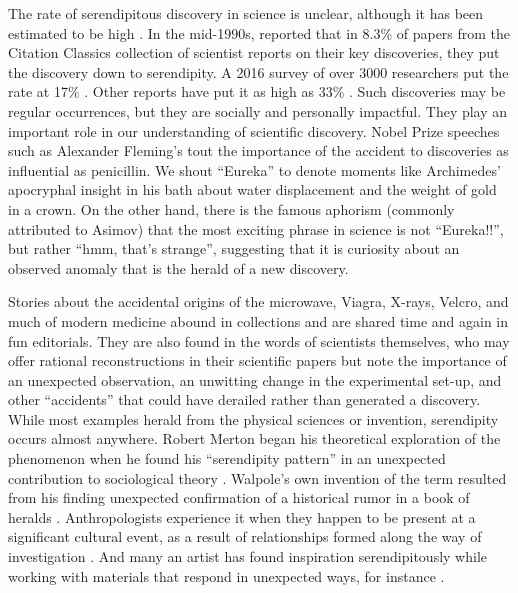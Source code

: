 \documentclass[authordate, empirical]{jote-new-article}
\begin{document}
The rate of serendipitous discovery in science is unclear, although it has been estimated to be high \parencites{Thagard2012}. In the mid-1990s, \textcites{Campanario1996} reported that in 8.3\% of papers from the Citation Classics collection of scientist reports on their key discoveries, they put the discovery down to serendipity. A 2016 survey of over 3000 researchers put the rate at 17\% \parencites{Willems2022}. Other reports have put it as high as 33\% \parencites{Hargrave-Thomas2012}. Such discoveries may be regular occurrences, but they are socially and personally impactful. They play an important role in our understanding of scientific discovery. Nobel Prize speeches such as Alexander Fleming's tout the importance of the accident to discoveries as influential as penicillin. We shout “Eureka” to denote moments like Archimedes' apocryphal insight in his bath about water displacement and the weight of gold in a crown. On the other hand, there is the famous aphorism (commonly attributed to Asimov) that the most exciting phrase in science is not “Eureka!!”, but rather “hmm, that's strange”, suggesting that it is curiosity about an observed anomaly that is the herald of a new discovery.



Stories about the accidental origins of the microwave, Viagra, X-rays, Velcro, and much of modern medicine abound in collections and are shared time and again in fun editorials. They are also found in the words of scientists themselves, who may offer rational reconstructions in their scientific papers but note the importance of an unexpected observation, an unwitting change in the experimental set-up, and other “accidents” that could have derailed rather than generated a discovery. While most examples herald from the physical sciences or invention, serendipity occurs almost anywhere. Robert Merton began his theoretical exploration of the phenomenon when he found his “serendipity pattern” in an unexpected contribution to sociological theory \parencites{Merton1948}. Walpole's own invention of the term resulted from his finding unexpected confirmation of a historical rumor in a book of heralds \parencites{Walpole1754}. Anthropologists experience it when they happen to be present at a significant cultural event, as a result of relationships formed along the way of investigation \parencites[e.g.,][]{Fine2006}. And many an artist has found inspiration serendipitously while working with materials that respond in unexpected ways, for instance \parencites[see][for examples]{Ross2023}.
\end{document}

